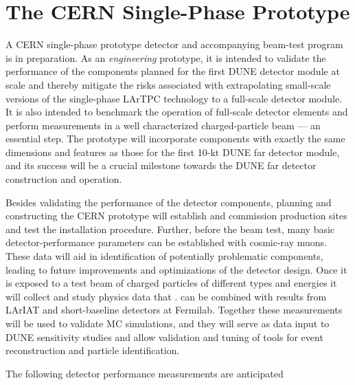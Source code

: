 \section{The CERN Single-Phase Prototype}
\label{sec:proto-cern-single}

A CERN single-phase prototype detector and accompanying beam-test program is in preparation. As an \textit{engineering} prototype, it is intended to validate the performance of the components planned for the first DUNE  detector module at scale and thereby
mitigate the risks associated with extrapolating small-scale versions of the single-phase LArTPC technology
to a full-scale detector module.
It is also intended to benchmark the operation of full-scale detector elements
and perform measurements in a well characterized charged-particle beam --- an essential step.
%
The prototype will incorporate components with exactly
the same dimensions and features as those for the first 10-kt DUNE far detector module, and its success will be a crucial milestone towards the DUNE far detector construction and operation.

Besides validating the performance of the %
detector components, planning and constructing the CERN prototype will
establish and commission production sites and test the installation procedure.
Further, before the beam test, many basic detector-performance parameters can be established with cosmic-ray muons.  These data will aid in identification of potentially problematic components, leading to future improvements and optimizations of the detector design.
%
Once it is exposed to a test beam of charged particles of different types and energies it will %
collect and study physics data that . %
can be combined with results from %
LArIAT and short-baseline
 detectors at Fermilab. Together these measurements will be used to %
 validate MC simulations, and they will serve as data input to DUNE
 sensitivity studies  and allow validation and tuning of tools for event reconstruction and particle identification.
 
 The following detector performance measurements are anticipated
 
